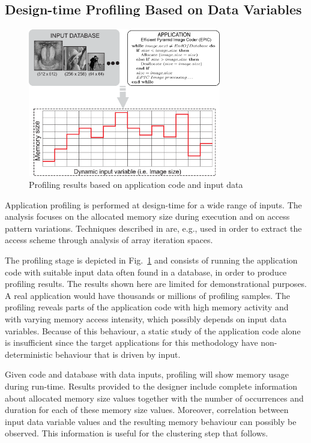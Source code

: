 \documentclass[smallcondensed]{svjour3}
\begin{document}
\subsection{Design-time Profiling Based on Data Variables}

\begin{figure}
\centering
\includegraphics[width=0.75\textwidth]{Images/profiling2.eps}
\caption{Profiling results based on application code and input data}
\label{fig:profiling}
\end{figure}

Application profiling is performed at design-time for a wide range of inputs. 
The analysis focuses on the allocated memory size during execution and on access pattern variations. 
Techniques described in \cite{Ang13b} are, e.g., used in order to extract the access scheme through analysis of array iteration spaces.  

The profiling stage is depicted in Fig.~\ref{fig:profiling} and consists of running the application code with suitable input data often found in a database, in order to produce profiling results. 
The results shown here are limited for demonstrational purposes. 
A real application would have thousands or millions of profiling samples. 
The profiling reveals parts of the application code with high memory activity and with varying memory access intensity, which possibly depends on input data variables. 
Because of this behaviour, a static study of the application code alone is insufficient since the target applications for this methodology have non-deterministic behaviour that is driven by input.

Given code and database with data inputs, profiling will show memory usage during run-time.
Results provided to the designer include complete information about allocated memory size values together with the number of occurrences and duration for each of these memory size values. 
Moreover, correlation between input data variable values and the resulting memory behaviour can possibly be observed. This information is useful for the clustering step that follows. 
\end{document}
